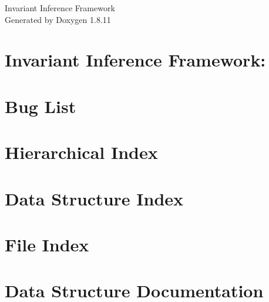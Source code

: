 \documentclass[twoside]{book}
\newcommand{\+}{\discretionary{\mbox{\scriptsize$\hookleftarrow$}}{}{}}
\newcommand{\clearemptydoublepage}{%
  \newpage{\pagestyle{empty}\cleardoublepage}%
}
\begin{document}
\hypersetup{pageanchor=false,
             bookmarks=true,
             bookmarksnumbered=true,
             pdfencoding=unicode
            }
\begin{titlepage}
\vspace*{7cm}
\begin{center}%
{\Large Invariant Inference Framework }\\
\vspace*{1cm}
{\large Generated by Doxygen 1.8.11}\\
\end{center}
\end{titlepage}
\clearemptydoublepage
\tableofcontents
\clearemptydoublepage
{}
\hypersetup{pageanchor=true}

\chapter{Invariant Inference Framework\+:}
\label{md_README}
\hypertarget{md_README}{}

\chapter{Bug List}
\label{bug}
\hypertarget{bug}{}

\chapter{Hierarchical Index}

\chapter{Data Structure Index}

\chapter{File Index}

\chapter{Data Structure Documentation}
























\end{document}
